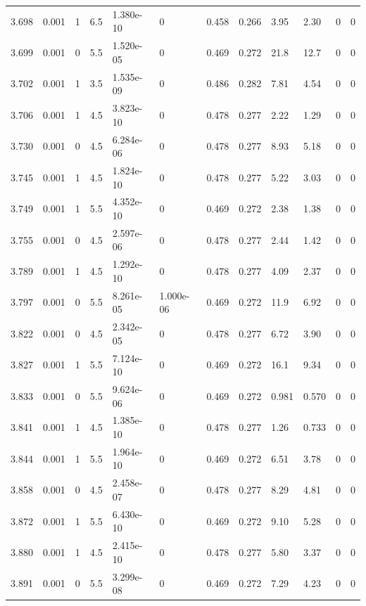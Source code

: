 \documentclass[preview]{standalone}
\begin{document}
{{{{{{{\begin{tabular}{L{1.2cm}C{1.2cm} C{0.3cm}C{0.5cm} C{1.4cm}C{1.4cm} C{1.4cm}C{1.4cm} C{1.6cm}C{1.6cm} C{1.6cm}C{1.6cm}}
  3.698  &  0.001  & 1     & 6.5 &  1.380e-10  & 0  &  0.458&   0.266& 3.95 & 2.30   &  0 & 0  \\ 
  3.699  &  0.001  & 0     & 5.5 &  1.520e-05  & 0  &  0.469&   0.272& 21.8 & 12.7   &  0 & 0  \\ 
  3.702  &  0.001  & 1     & 3.5 &  1.535e-09  & 0  &  0.486&   0.282& 7.81 & 4.54   &  0 & 0  \\ 
  3.706  &  0.001  & 1     & 4.5 &  3.823e-10  & 0  &  0.478&   0.277& 2.22 & 1.29   &  0 & 0  \\ 
  3.730  &  0.001  & 0     & 4.5 &  6.284e-06  & 0  &  0.478&   0.277& 8.93 & 5.18   &  0 & 0  \\ 
  3.745  &  0.001  & 1     & 4.5 &  1.824e-10  & 0  &  0.478&   0.277& 5.22 & 3.03   &  0 & 0  \\ 
  3.749  &  0.001  & 1     & 5.5 &  4.352e-10  & 0  &  0.469&   0.272& 2.38 & 1.38   &  0 & 0  \\ 
  3.755  &  0.001  & 0     & 4.5 &  2.597e-06  & 0  &  0.478&   0.277& 2.44 & 1.42   &  0 & 0  \\ 
  3.789  &  0.001  & 1     & 4.5 &  1.292e-10  & 0  &  0.478&   0.277& 4.09 & 2.37   &  0 & 0  \\ 
  3.797  &  0.001  & 0     & 5.5 &  8.261e-05  & 1.000e-06  &  0.469&   0.272& 11.9 & 6.92   &  0 & 0  \\ 
  3.822  &  0.001  & 0     & 4.5 &  2.342e-05  & 0  &  0.478&   0.277& 6.72 & 3.90   &  0 & 0  \\ 
  3.827  &  0.001  & 1     & 5.5 &  7.124e-10  & 0  &  0.469&   0.272& 16.1 & 9.34   &  0 & 0  \\ 
  3.833  &  0.001  & 0     & 5.5 &  9.624e-06  & 0  &  0.469&   0.272& 0.981 & 0.570   &  0 & 0  \\ 
  3.841  &  0.001  & 1     & 4.5 &  1.385e-10  & 0  &  0.478&   0.277& 1.26 & 0.733   &  0 & 0  \\ 
  3.844  &  0.001  & 1     & 5.5 &  1.964e-10  & 0  &  0.469&   0.272& 6.51 & 3.78   &  0 & 0  \\ 
  3.858  &  0.001  & 0     & 4.5 &  2.458e-07  & 0  &  0.478&   0.277& 8.29 & 4.81   &  0 & 0  \\ 
  3.872  &  0.001  & 1     & 5.5 &  6.430e-10  & 0  &  0.469&   0.272& 9.10 & 5.28   &  0 & 0  \\ 
  3.880  &  0.001  & 1     & 4.5 &  2.415e-10  & 0  &  0.478&   0.277& 5.80 & 3.37   &  0 & 0  \\ 
  3.891  &  0.001  & 0     & 5.5 &  3.299e-08  & 0  &  0.469&   0.272& 7.29 & 4.23   &  0 & 0  \\ 

\end{tabular}}}}}}}}
\end{document}
